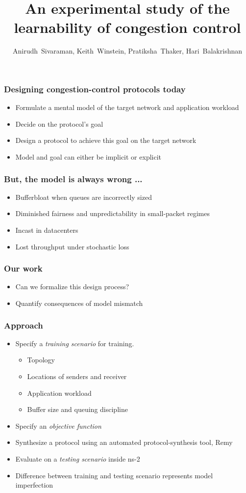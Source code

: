 \documentclass[svgnames]{beamer}
\title{An experimental study of the learnability of congestion control}
\author{Anirudh~Sivaraman, Keith~Winstein, Pratiksha~Thaker, Hari~Balakrishnan}
\institute{MIT CSAIL\vspace{\baselineskip}}
\begin{document}
\begin{frame}

\titlepage

\end{frame}

\begin{Large}
\begin{frame}
\frametitle{Designing congestion-control protocols today}
\begin{itemize}
\item Formulate a mental model of the target network and application workload
\item Decide on the protocol's goal
\item Design a protocol to achieve this goal on the target network
\item Model and goal can either be implicit or explicit
\end{itemize}
\end{frame}

\begin{frame}
\frametitle{But, the model is always wrong ...}
\begin{itemize}
\item Bufferbloat when queues are incorrectly sized
\item Diminished fairness and unpredictability in small-packet regimes
\item Incast in datacenters
\item Lost throughput under stochastic loss 
\end{itemize}
\end{frame}

\begin{frame}
\frametitle{Our work}
\begin{itemize}
\item Can we formalize this design process?
\item Quantify consequences of model mismatch
\end{itemize}
\end{frame}

\begin{frame}
\frametitle{Approach}
\begin{itemize}
\item Specify a \textit{training scenario} for training.
\begin{itemize}
\item Topology
\item Locations of senders and receiver
\item Application workload
\item Buffer size and queuing discipline 
\end{itemize}
\item Specify an \textit{objective function}
\item Synthesize a protocol using an automated protocol-synthesis tool, Remy~\cite{remy}
\item Evaluate on a \textit{testing scenario} inside ns-2
\item Difference between training and testing scenario represents model imperfection
\end{itemize}
\end{frame}


\end{Large}
\end{document}
